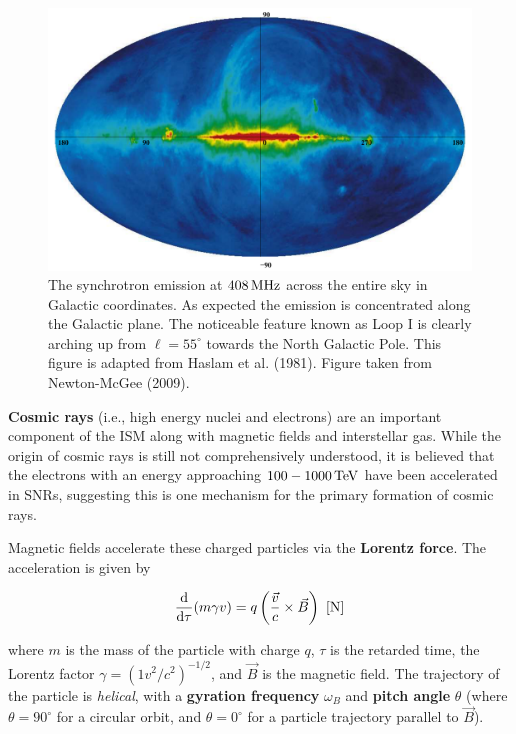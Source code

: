 \documentclass[a4paper,10pt]{article}
\begin{document}
\begin{figure}[h]
    \centering
    \includegraphics[width=12cm]{figures/Haslam408.png}
    \caption{\footnotesize{The synchrotron emission at $408\,{\rm MHz}$ across the entire sky in Galactic coordinates. As expected the emission is concentrated along the Galactic plane. The noticeable feature known as Loop I is clearly arching up from $\ell=55^\circ$ towards the North Galactic Pole. This figure is adapted from Haslam et al. (1981). Figure taken from Newton-McGee (2009).}}
    \label{fig:haslam408}
\end{figure}

{\noindent}\textbf{Cosmic rays} (i.e., high energy nuclei and electrons) are an important component of the ISM along with magnetic fields and interstellar gas. While the origin of cosmic rays is still not comprehensively understood, it is believed that the electrons with an energy approaching $100-1000\,{\rm TeV}$ have been accelerated in SNRs, suggesting this is one mechanism for the primary formation of cosmic rays.

{\noindent}Magnetic fields accelerate these charged particles via the \textbf{Lorentz force}. The acceleration is given by

\begin{align*}
    \frac{{\rm d}}{{\rm d}\tau}(m\gamma v) = q\left(\frac{\vec{v}}{c}\times\vec{B}\right) ~ [{\rm N}]
\end{align*}

{\noindent}where $m$ is the mass of the particle with charge $q$, $\tau$ is the retarded time, the Lorentz factor  $\gamma=(1 v^2/c^2)^{-1/2}$, and $\vec{B}$ is the magnetic field. The trajectory of the particle is \textit{helical}, with a \textbf{gyration frequency} $\omega_B$ and \textbf{pitch angle} $\theta$ (where $\theta=90^\circ$ for a circular orbit, and $\theta=0^\circ$ for a particle trajectory parallel to $\vec{B}$).
\end{document}
